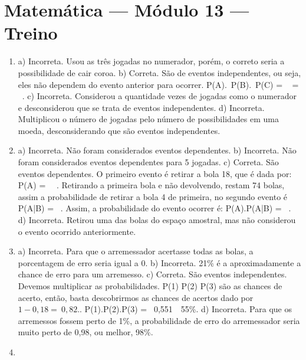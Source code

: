 \section*{Matemática — Módulo 13 — Treino}

\begin{enumerate}
\item a) Incorreta. Usou as três jogadas no numerador, porém, o correto
seria a possibilidade de cair coroa.
b) Correta. São de eventos independentes, ou seja, eles não
dependem do evento anterior para ocorrer. P(A).\ P(B).\ P(C) = \  \times {} \times {} = \ .
c) Incorreta. Considerou a quantidade vezes de jogadas como o
numerador e desconsiderou que se trata de eventos independentes.
d) Incorreta. Multiplicou o número de jogadas pelo número de
possibilidades em uma moeda, desconsiderando que são eventos
independentes.

\item a) Incorreta. Não foram considerados eventos dependentes.
b) Incorreta. Não foram considerados eventos dependentes para 5
jogadas.
c) Correta. São eventos dependentes. O primeiro evento é retirar a
bola 18, que é dada por: P(A) = \ \ . Retirando a
primeira bola e não devolvendo, restam 74 bolas, assim a probabilidade
de retirar a bola 4 de primeira, no segundo evento é
P(A|B) = \ . Assim, a probabilidade do evento ocorrer é:
P(A).P(A|B) = \ .
d) Incorreta. Retirou uma das bolas do espaço amostral, mas não
considerou o evento ocorrido anteriormente.

\item a) Incorreta. Para que o arremessador acertasse todas as bolas, a
porcentagem de erro seria igual a 0.
b) Incorreta. 21\% é a aproximadamente a chance de erro para um
arremesso.
c) Correta. São eventos independentes. Devemos multiplicar as
probabilidades. P(1) P(2) P(3) são as chances de acerto, então, basta
descobrirmos as chances de acertos dado por \(1 - 0,18 = \ 0,82.\). P(1).P(2).P(3) = \ 0,551\ \ 55\%.
d) Incorreta. Para que os arremessos fossem perto de 1\%, a
probabilidade de erro do arremessador seria muito perto de 0,98, ou
melhor, 98\%.
\item 
\end{enumerate}


